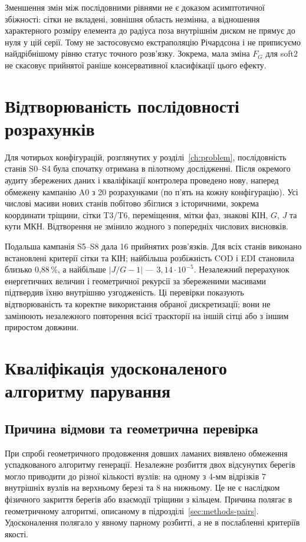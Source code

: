Зменшення змін між послідовними рівнями не є доказом асимптотичної збіжності: сітки не вкладені, зовнішня область незмінна, а відношення характерного розміру елемента до радіуса поза внутрішнім диском не прямує до нуля у цій серії. Тому не застосовуємо екстраполяцію Річардсона і не приписуємо найдрібнішому рівню статус точного розв'язку. Зокрема, мала зміна $F_G$ для soft2 не скасовує прийнятої раніше консервативної класифікації цього ефекту.

\section{Відтворюваність послідовності розрахунків}
\label{sec:ver-reproduction}

Для чотирьох конфігурацій, розглянутих у розділі~\ref{ch:problem}, послідовність станів S0--S4 була спочатку отримана в пілотному дослідженні. Після окремого аудиту збережених даних і кваліфікації контролера проведено нову, наперед обмежену кампанію A0 з 20 розрахунками (по п'ять на кожну конфігурацію). Усі числові масиви нових станів побітово збіглися з історичними, зокрема координати тріщини, сітки T3/T6, переміщення, мітки фаз, знакові КІН, $G$, $J$ та кути МКН. Відтворення не змінило жодного з попередніх числових висновків.

Подальша кампанія S5--S8 дала 16 прийнятих розв'язків. Для всіх станів виконано встановлені критерії сітки та КІН; найбільша розбіжність COD і EDI становила близько 0,88\,\%, а найбільше $|J/G-1|$ --- $3{,}14\cdot10^{-5}$. Незалежний перерахунок енергетичних величин і геометричної рекурсії за збереженими масивами підтвердив їхню внутрішню узгодженість. Ці перевірки показують відтворюваність та коректне використання обраної дискретизації; вони не замінюють незалежного повторення всієї траєкторії на іншій сітці або з іншим приростом довжини.

\section{Кваліфікація удосконаленого алгоритму парування}
\label{sec:ver-pairing}

\subsection{Причина відмови та геометрична перевірка}

При спробі геометричного продовження довших ламаних виявлено обмеження успадкованого алгоритму генерації. Незалежне розбиття двох відсунутих берегів могло приводити до різної кількості вузлів: на одному з 4-мм відрізків 7 внутрішніх вузлів на верхньому березі та 8 на нижньому. Це не є наслідком фізичного закриття берегів або взаємодії тріщини з кільцем. Причина полягає в геометричному алгоритмі, описаному в підрозділі~\ref{sec:methods-pairs}. Удосконалення полягало у явному парному розбитті, а не в послабленні критеріїв якості.

